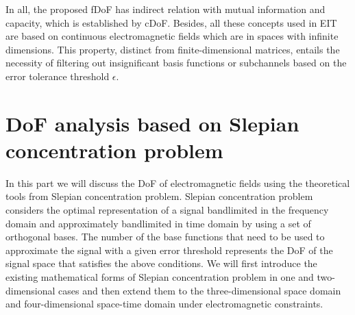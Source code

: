 \documentclass[12pt,draftclsnofoot,journal,onecolumn]{IEEEtran}
\begin{document}
{	In all, the proposed fDoF has indirect relation with mutual information and capacity, which is established by cDoF. Besides, all these concepts used in EIT are based on continuous electromagnetic fields which are in spaces with infinite dimensions. This property, distinct from finite-dimensional matrices, entails the necessity of filtering out insignificant basis functions or subchannels based on the error tolerance threshold $\epsilon$. 
	
	}
	
	\section{DoF analysis based on Slepian concentration problem}
	\label{sec_theoretical_dof}
	In this part we will discuss the DoF of electromagnetic fields using the theoretical tools from Slepian concentration problem. 
	Slepian concentration problem considers the optimal representation of a signal bandlimited in the frequency domain and approximately bandlimited in time domain by using a set of orthogonal bases. The number of the base functions that need to be used to approximate the signal with a given error threshold represents the DoF of the signal space that satisfies the above conditions. We will first introduce the existing mathematical forms of Slepian concentration problem in one and two-dimensional cases and then extend them to the three-dimensional space domain and four-dimensional space-time domain under electromagnetic constraints. 
	
\end{document}
